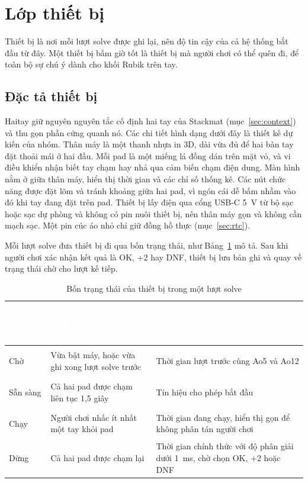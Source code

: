 \section{Lớp thiết bị}
Thiết bị là nơi mỗi lượt solve được ghi lại, nên độ tin cậy của cả hệ thống bắt đầu từ đây. Một thiết bị bấm giờ tốt là thiết bị mà người chơi có thể quên đi, để toàn bộ sự chú ý dành cho khối Rubik trên tay.

\subsection{Đặc tả thiết bị}
Haitay giữ nguyên nguyên tắc cố định hai tay của Stackmat (mục~\ref{sec:context}) và thu gọn phần cứng quanh nó. Các chi tiết hình dạng dưới đây là thiết kế dự kiến của nhóm. Thân máy là một thanh nhựa in 3D, dài vừa đủ để hai bàn tay đặt thoải mái ở hai đầu. Mỗi pad là một miếng lá đồng dán trên mặt vỏ, và vi điều khiển nhận biết tay chạm hay nhả qua cảm biến chạm điện dung. Màn hình nằm ở giữa thân máy, hiển thị thời gian và các chỉ số thống kê. Các nút chức năng được đặt lõm và tránh khoảng giữa hai pad, vì ngón cái dễ bấm nhầm vào đó khi tay đang đặt trên pad. Thiết bị lấy điện qua cổng USB-C 5~V từ bộ sạc hoặc sạc dự phòng và không có pin nuôi thiết bị, nên thân máy gọn và không cần mạch sạc. Một pin cúc áo nhỏ chỉ giữ đồng hồ thực (mục~\ref{sec:rtc}).

Mỗi lượt solve đưa thiết bị đi qua bốn trạng thái, như Bảng~\ref{tab:states} mô tả. Sau khi người chơi xác nhận kết quả là OK, +2 hay DNF, thiết bị lưu bản ghi và quay về trạng thái chờ cho lượt kế tiếp.

\begin{table}[H]
    \centering
    \renewcommand{\arraystretch}{1.5}
    \caption{Bốn trạng thái của thiết bị trong một lượt solve}
    \label{tab:states}
    \begin{tabular}{>{\bfseries\raggedright\arraybackslash}m{2.4cm} >{\raggedright\arraybackslash}m{5.6cm} >{\raggedright\arraybackslash}m{6.2cm}}
        \toprule
        \rowcolor{haitayblue}
        \textcolor{white}{Trạng thái} & \textcolor{white}{Điều kiện chuyển vào} & \textcolor{white}{Màn hình hiển thị} \\
        \midrule
        \rowcolor{haitayblue!8}
        Chờ & Vừa bật máy, hoặc vừa ghi xong lượt solve trước & Thời gian lượt trước cùng Ao5 và Ao12 \\
        Sẵn sàng & Cả hai pad được chạm liên tục 1,5 giây & Tín hiệu cho phép bắt đầu \\
        \rowcolor{haitayblue!8}
        Chạy & Người chơi nhấc ít nhất một tay khỏi pad & Thời gian đang chạy, hiển thị gọn để không phân tán người chơi \\
        Dừng & Cả hai pad được chạm lại & Thời gian chính thức với độ phân giải dưới 1~ms, chờ chọn OK, +2 hoặc DNF \\
        \bottomrule
    \end{tabular}
\end{table}

